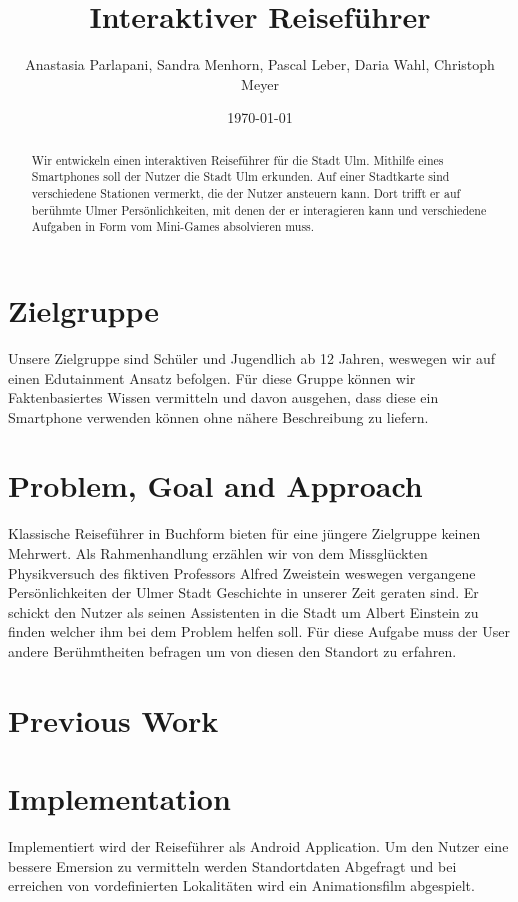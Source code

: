 \documentclass[]{hci-proposal}
\title{Interaktiver Reiseführer}
\author{Anastasia Parlapani, Sandra Menhorn, Pascal Leber, Daria Wahl, Christoph Meyer}
\date{\today}
\begin{document}

\maketitle

\begin{abstract}
  Wir entwickeln einen interaktiven Reiseführer für die Stadt Ulm. Mithilfe eines Smartphones soll
  der Nutzer die Stadt Ulm erkunden. Auf einer Stadtkarte sind verschiedene Stationen vermerkt, die
  der Nutzer ansteuern kann. Dort trifft er auf berühmte Ulmer Persönlichkeiten, mit denen der er
  interagieren kann und verschiedene Aufgaben in Form vom Mini-Games absolvieren muss. 
  
  
  
\end{abstract}


\section{Zielgruppe}
Unsere Zielgruppe sind Schüler und Jugendlich ab 12 Jahren, weswegen wir auf einen Edutainment Ansatz befolgen.
Für diese Gruppe können wir Faktenbasiertes Wissen vermitteln und davon ausgehen, dass diese ein Smartphone verwenden können ohne nähere Beschreibung zu liefern.


\section{Problem, Goal and Approach}
Klassische Reiseführer in Buchform bieten für eine jüngere Zielgruppe keinen Mehrwert.
Als Rahmenhandlung erzählen wir von dem Missglückten Physikversuch des fiktiven Professors Alfred Zweistein weswegen vergangene Persönlichkeiten der Ulmer Stadt Geschichte in unserer Zeit geraten sind.
Er schickt den Nutzer als seinen Assistenten in die Stadt um Albert Einstein zu finden welcher ihm bei dem Problem helfen soll.
Für diese Aufgabe muss der User andere Berühmtheiten befragen um von diesen den Standort zu erfahren.


\section{Previous Work}


\section{Implementation}
Implementiert wird der Reiseführer als Android Application. Um den Nutzer eine bessere Emersion  zu vermitteln werden Standortdaten Abgefragt und bei erreichen von vordefinierten Lokalitäten wird ein Animationsfilm abgespielt.
\end{document}
